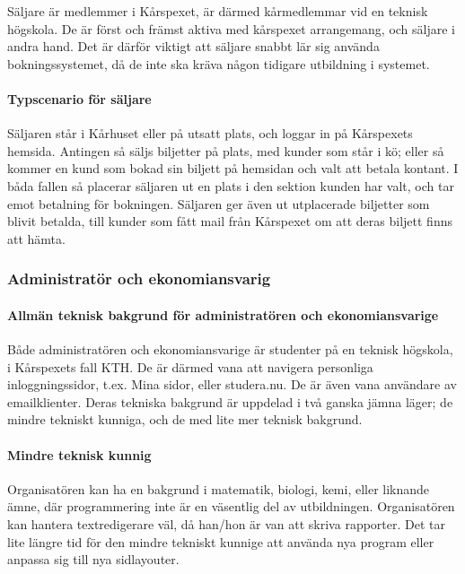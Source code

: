 \documentclass[a4paper, twoside, 11pt, titlepage]{article}
\begin{document}
			Säljare är medlemmer i Kårspexet, är därmed kårmedlemmar vid en teknisk högskola. De är först och främst aktiva med kårspexet arrangemang, och säljare i andra hand. Det är därför viktigt att säljare snabbt lär sig använda bokningssystemet, då de inte ska kräva någon tidigare utbildning i systemet.

			\paragraph{Typscenario för säljare}

			Säljaren står i Kårhuset eller på utsatt plats, och loggar in på Kårspexets hemsida. Antingen så säljs biljetter på plats, med kunder som står i kö; eller så kommer en kund som bokad sin biljett på hemsidan och valt att betala kontant. I båda fallen så placerar säljaren ut en plats i den sektion kunden har valt, och tar emot betalning för bokningen. Säljaren ger även ut utplacerade biljetter som blivit betalda, till kunder som fått mail från Kårspexet om att deras biljett finns att hämta.

	\subsubsection{Administratör och ekonomiansvarig}



			\paragraph{Allmän teknisk bakgrund för administratören och ekonomiansvarige}

			Både administratören och ekonomiansvarige är studenter på en teknisk högskola, i Kårspexets fall KTH. De är därmed vana att navigera personliga inloggningssidor, t.ex. Mina sidor, eller studera.nu. De är även vana användare av emailklienter. Deras tekniska bakgrund är uppdelad i två ganska jämna läger; de mindre tekniskt kunniga, och de med lite mer teknisk bakgrund.

			\paragraph{Mindre teknisk kunnig}

			Organisatören kan ha en bakgrund i matematik, biologi, kemi, eller liknande ämne, där programmering inte är en väsentlig del av utbildningen. Organisatören kan hantera textredigerare väl, då han/hon är van att skriva rapporter. Det tar lite längre tid för den mindre tekniskt kunnige att använda nya program eller anpassa sig till nya sidlayouter.
\end{document}
